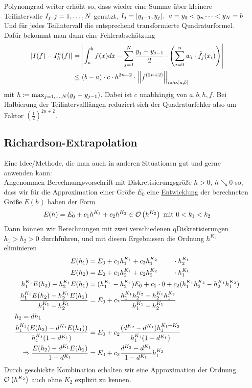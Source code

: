 \documentclass{../Skript}
\begin{document}
{Polynomgrad weiter erhöht so, dass wieder eine Summe über kleinere Teilintervalle $I_j, \igb j 1 N$ genutzt,
$I_j = [y_{j-1}, y_j], \hspace{.5em} a=y_0< y_n \dots < y_N = b$
Und für jedes Teilintervall die entsprechend transformierte Quadraturformel. Dafür bekommt man
dann eine Fehlerabschätzung \begin{align*}
        \left\vert I(f) - I_h^{n}(f) \right\vert &= \left\vert \int_a^b f(x)dx - \sum_{j=1}^N \frac{y_j-y_{j-1}}{2}\cdot \left(\sum_{i=0}^n w_i \cdot \Tilde{f_j}(x_i)\right) \right\vert\\
        &\leq (b-a)\cdot c \cdot h^{2n+2}\cdot \left\vert\left\vert f^{(2n+2)}\right\vert\right\vert_{\max[a,b]}
    \end{align*}
    mit $h\coloneqq \max_{\igb j 1 N}(y_j-y_{j-1})$. Dabei ist $c$ unabhängig von $a,b,h,f$.
    Bei Halbierung der Teilintervalllängen reduziert sich der Quadraturfehler also um 
    Faktor $\left(\frac{1}{2}\right)^{2n+2}$.
\subsection{Richardson-Extrapolation}
Eine Idee/Methode, die man auch in anderen Situationen gut und gerne anwenden 
kann:\\
Angenommen Berechnungsvorschrift mit Diskretisierungsgröße $h > 0$, $h\searrow 0$
so, dass wir für die Approximation einer Größe $E_0$ eine \underline{Entwicklung}
der berechneten Größe $E(h)$ haben der Form \[
    E(h)  = E_0 + c_1h^{K_1}+c_2h^{K_2} \in \calO{h^{K_2}}\text{ mit }0<k_1<k_2
\] 
Dann können wir Berechnungen mit zwei verschiedenen qDiskretisierungen $h_1 > h_2 
> 0$ durchführen, und mit diesen Ergebnissen die Ordnung $h^{K_1}$ eliminieren
\begin{align*}
    E(h_1)&=E_0+c_1h_1^{K_1}+c_2h_1^{K_2}\qquad \vert\cdot h_2^{K_1}\\
    E(h_2)&=E_0+c_1h_2^{K_1}+c_2h_2^{K_2}\qquad \vert\cdot h_1^{K_1}\\
    h_1^{K_1}E(h_2)-h_2^{K_1}E(h_1)&=(h_1^{K_1}-h_2^{K_1})E_0+c_1\cdot0+c_2(h_1^{K_1}h_2^{K_2}-h_2^{K_1}h_1^{K_2})\\
    \frac{ h_1^{K_1}E(h_2)-h_2^{K_1}E(h_1)}{h_1^{K_1}-h_2^{K_1}}&= E_0+c_2\frac{h_1^{K_1}h_2^{K_2}-h_2^{K_1}h_1^{K_2}}{h_1^{K_1}-h_2^{K_1}}\\
    \intertext{\(h_2=dh_1\)}
    \frac{h_1^{K_1}(E(h_2)-d^{K_1}E(h_1))}{h_1^{K_1}(1-d^{K_1})}&= E_0+c_2\frac{(d^{K_2}-d^{K_1})h_1^{K_1+K_2}}{h_1^{K_1}(1-d^{K_1})}\\
    \Rightarrow \frac{E(h_2)-d^{K_1}E(h_1)}{1-d^{K_1}}&= E_0+c_2\frac{d^{K_2}-d^{K_1}}{1-d^{K_1}}h_1^{K_2}
\end{align*}
Durch geschickte Kombination erhalten wir eine Approximation der Ordnung \(\calO{h^{K_2}}\) auch ohne \(K_2\) explizit zu kennen.

}
\end{document}
